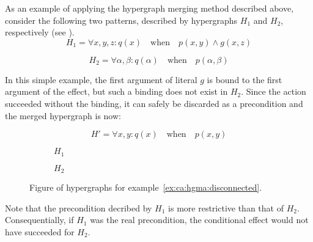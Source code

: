 \documentclass[../Master.tex]{subfiles}
\providecommand{\master}{..}
\begin{document}
\begin{example} \label{ex:ca:hgma:disconnected}
	As an example of applying the hypergraph merging method described above, consider the following two patterns, described by hypergraphs $H_1$ and $H_2$, respectively (see ).
    \begin{equation*}
        H_1 = \forall x, y, z : q(x) \quad \text{when} \quad
            p(x,y) \land g(x, z)
    \end{equation*}

    \begin{equation*}
        H_2 = \forall \alpha, \beta : q(\alpha) \quad \text{when} \quad
            p(\alpha, \beta)
    \end{equation*}

	In this simple example, the first argument of literal $g$ is bound to the first argument of the effect, but such a binding does not exist in $H_2$. Since the action succeeded without the binding, it can safely be discarded as a precondition and the merged hypergraph is now:

    \begin{equation*}
        H' = \forall x, y : q(x) \quad \text{when} \quad p(x, y)
    \end{equation*}

    \begin{figure}
        \centering
        \begin{subfigure}{0.4\textwidth}
            \centering
            \raisebox{-0.5\height}{\resizebox{\linewidth}{!}{}}
			\caption{$H_1$}
            \label{fig:ex:ca:hgma:ex:generalization1}
        \end{subfigure}%
        \hfill%
        \begin{subfigure}{0.4\textwidth}
            \centering
            \resizebox{0.65\linewidth}{!}{\raisebox{-0.5\height}{}}
            \caption{$H_2$}
            \label{fig:ex:ca:hgma:ex:generalization2}
        \end{subfigure}
        \caption{Figure of hypergraphs for example~\ref{ex:ca:hgma:disconnected}.}\label{fig:ex:ca:hgma:ex:disconnected}
    \end{figure}

    Note that the precondition decribed by $H_1$ is more restrictive than that of $H_2$. Consequentially, if $H_1$ was the real precondition, the conditional effect would not have succeeded for $H_2$.
\end{example}
\end{document}
